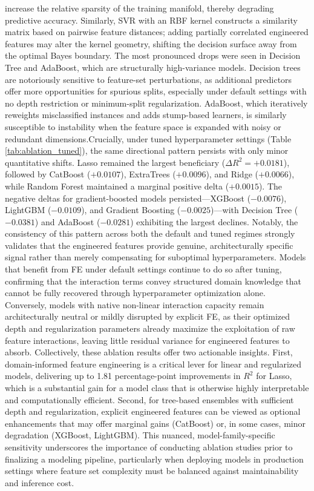 increase the relative sparsity of the training manifold, thereby degrading predictive accuracy. Similarly, SVR with an RBF kernel constructs a similarity matrix based on pairwise feature distances; adding partially correlated engineered features may alter the kernel geometry, shifting the decision surface away from the optimal Bayes boundary. The most pronounced drops were seen in Decision Tree and AdaBoost, which are structurally high-variance models. Decision trees are notoriously sensitive to feature-set perturbations, as additional predictors offer more opportunities for spurious splits, especially under default settings with no depth restriction or minimum-split regularization. AdaBoost, which iteratively reweights misclassified instances and adds stump-based learners, is similarly susceptible to instability when the feature space is expanded with noisy or redundant dimensions.Crucially, under tuned hyperparameter settings (Table \ref{tab:ablation_tuned})\cite{atique2026explainable}, the same directional pattern persists with only minor quantitative shifts. Lasso remained the largest beneficiary (\(\Delta R^2 = +0.0181\)), followed by CatBoost (\(+0.0107\)), ExtraTrees (\(+0.0096\)), and Ridge (\(+0.0066\)), while Random Forest maintained a marginal positive delta (\(+0.0015\)). The negative deltas for gradient-boosted models persisted—XGBoost (\(-0.0076\)), LightGBM (\(-0.0109\)), and Gradient Boosting (\(-0.0025\))—with Decision Tree (\(-0.0381\)) and AdaBoost (\(-0.0281\)) exhibiting the largest declines. Notably, the consistency of this pattern across both the default and tuned regimes strongly validates that the engineered features provide genuine, architecturally specific signal rather than merely compensating for suboptimal hyperparameters. Models that benefit from FE under default settings continue to do so after tuning, confirming that the interaction terms convey structured domain knowledge that cannot be fully recovered through hyperparameter optimization alone. Conversely, models with native non-linear interaction capacity remain architecturally neutral or mildly disrupted by explicit FE, as their optimized depth and regularization parameters already maximize the exploitation of raw feature interactions, leaving little residual variance for engineered features to absorb.
Collectively, these ablation results offer two actionable insights. First, domain-informed feature engineering is a critical lever for linear and regularized models, delivering up to 1.81 percentage-point improvements in \(R^2\) for Lasso, which is a substantial gain for a model class that is otherwise highly interpretable and computationally efficient. Second, for tree-based ensembles with sufficient depth and regularization, explicit engineered features can be viewed as optional enhancements that may offer marginal gains (CatBoost) or, in some cases, minor degradation (XGBoost, LightGBM). This nuanced, model-family-specific sensitivity underscores the importance of conducting ablation studies prior to finalizing a modeling pipeline, particularly when deploying models in production settings where feature set complexity must be balanced against maintainability and inference cost.


